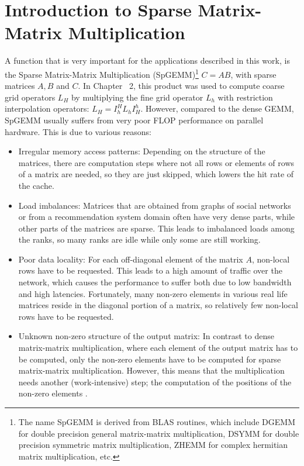 \section{Introduction to Sparse Matrix-Matrix Multiplication}
A function that is very important for the applications described in this work, is the Sparse Matrix-Matrix Multiplication (SpGEMM)\footnote{The name SpGEMM is derived from BLAS routines, which include DGEMM for double precision general matrix-matrix multiplication, DSYMM for double precision symmetric matrix multiplication, ZHEMM for complex hermitian matrix multiplication, etc.} $C = A B$, with sparse matrices $A, B$ and $C$. In Chapter ~2, this product was used to compute coarse grid operators $L_H$ by multiplying the fine grid operator $L_h$ with restriction interpolation operators: $L_H = I_h^HL_h I_H^h$.
However, compared to the dense GEMM, SpGEMM usually suffers from very poor FLOP performance on parallel hardware. This is due to various reasons:  
\begin{itemize}
\item Irregular memory access patterns: Depending on the structure of the matrices, there are computation steps where not all rows or elements of rows of a matrix are needed, so they are just skipped, which lowers the hit rate of the cache.
\item Load imbalances: Matrices that are obtained from graphs of social networks or from a recommendation system domain often have very dense parts, while other parts of the matrices are sparse. This leads to imbalanced loads among the ranks, so many ranks are idle while only some are still working.
\item Poor data locality: For each off-diagonal element of the matrix $A$, non-local rows have to be requested. This leads to a high amount of traffic over the network, which causes the performance to suffer both due to low bandwidth and high latencies. Fortunately, many non-zero elements in various real life matrices reside in the diagonal portion of a matrix, so relatively few non-local rows have to be requested.  
\item Unknown non-zero structure of the output matrix: In contrast to dense matrix-matrix multiplication, where each element of the output matrix has to be computed, only the non-zero elements have to be computed  for sparse matrix-matrix multiplication. However, this means that the multiplication needs another (work-intensive) step; the computation of the positions of the non-zero elements \cite{intel_algorithm}.
\end{itemize}

